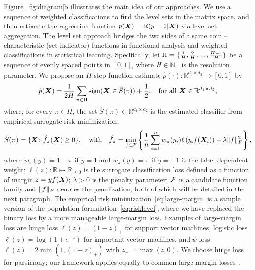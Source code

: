 \documentclass[11pt]{article}
\theoremstyle{definition}
\def\sign{\textup{sign}}
\begin{document}
Figure~\ref{fig:diagram}b illustrates the main idea of our approaches. We use a sequence of weighted classifications to find the level sets in the matrix space, and then estimate the regression function $p(\bm X)=\mathbb{E}(y=1|\bm X)$ via level set aggregation. The level set approach bridges the two sides of a same coin -- characteristic (set indicator) functions in functional analysis and weighted classifications in statistical learning. Specifically, let $\Pi=\{{1\over H},{2\over H} \ldots, {H-1\over H} \}$ be a sequence of evenly spaced points in $[0,1]$, where $H\in\mathbb{N}_{+}$ is the resolution parameter. We propose an $H$-step function estimate $\hat p(\cdot)\colon \mathbb{R}^{d_1\times d_2} \to [0,1]$ by
\begin{equation}\label{eq:stepfunction}
\hat p(\mX)= {1\over 2H}  \sum_{\pi \in \Pi} \sign (\mX\in \hat S(\pi))+{1\over 2},\quad \text{for all }\mX\in\mathbb{R}^{d_1\times d_2},
\end{equation}
where, for every $\pi\in\Pi$, the set $\hat S(\pi)\subset \mathbb{R}^{d_1\times d_2}$ is the estimated classifier from empirical surrogate risk minimization,
\begin{align}\label{eq:large-margin}
\hat S(\pi) = \{\bm X \colon \hat f_\pi(\bm X) \geq 0\}, \quad \text{with}\quad \hat f_\pi=\min_{f\in\mathcal{F}}\left\{ {1\over n}\sum_{i=1}^n w_{\pi}(y_i)\ell\left(y_if(\bm X_i)\right)+ \lambda \lVert f\rVert_F^2\right\},
\end{align}
where $w_\pi(y) = 1-\pi $ if $y = 1$ and $w_\pi(y)=\pi$ if $y = -1$ is the label-dependent weight; $\ell(z)\colon \mathbb{R}\mapsto \mathbb{R}_{\geq 0}$ is the surrogate classification loss defined as a function of margin $z=yf(\bm X)$; $\lambda>0$ is the penalty parameter; $\mathcal{F}$ is a candidate function family and $\lVert f\rVert_F$ denotes the penalization, both of which will be detailed in the next paragraph. The empirical risk minimization~\eqref{eq:large-margin} is a sample version of the population formulation~\eqref{eq:risklevel}, where we have replaced the binary loss by a more manageable large-margin loss. Examples of large-margin loss are hinge loss $\ell(z) = (1-z)_+$ for support vector machines, logistic loss $\ell(z) =\log(1+e^{-z})$ for important vector machines, and $\psi$-loss $\ell(z)=2\min(1,(1-z)_+)$ with $z_{+}=\max(z,0)$. We choose hinge loss for parsimony; our framework applies equally to common large-margin losses~\citep{bartlett2006convexity}. 
\end{document}
